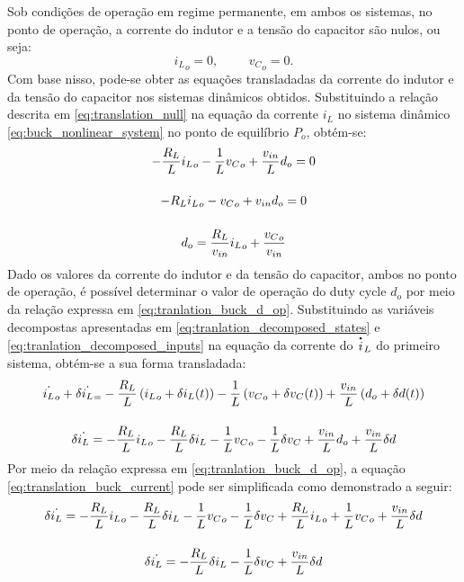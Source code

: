 Sob condições de operação em regime permanente, em ambos os sistemas, no ponto de operação, a corrente do indutor e a tensão do capacitor são nulos, ou seja: \begin{equation} {i_L}_o = 0, \hspace{1cm} {v_C}_o = 0. \label{eq:translation_null}\end{equation} Com base nisso, pode-se obter as equações transladadas da corrente do indutor e da tensão do capacitor nos sistemas dinâmicos obtidos. Substituindo a relação descrita em \eqref{eq:translation_null} na equação da corrente $i_L$ no sistema dinâmico \eqref{eq:buck_nonlinear_system} no ponto de equilíbrio $P_o$, obtém-se: \begin{gather}
  - \frac{R_L}{L} {i_L}_o - \frac{1}{L} {v_C}_o + \frac{v_{in}}{L}  d_o = 0  \notag \\[12pt]
  - R_L {i_L}_o - {v_C}_o + v_{in}  d_o = 0 \notag \\[12pt]
  d_o = \frac{R_L}{v_{in}} {i_L}_o + \frac{{v_C}_o}{v_{in}} \label{eq:tranlation_buck_d_op}
\end{gather} Dado os valores da corrente do indutor e da tensão do capacitor, ambos no ponto de operação, é possível determinar o valor de operação do duty cycle $d_o$ por meio da relação expressa em \eqref{eq:tranlation_buck_d_op}. Substituindo as variáveis decompostas apresentadas em \eqref{eq:tranlation_decomposed_states} e \eqref{eq:tranlation_decomposed_inputs} na equação da corrente do $\dt{i}_L$ do primeiro sistema, obtém-se a sua forma transladada: \begin{gather}
  {\dot{i_L}}_o + \delta \dot{i_L}_ = - \frac{R_L}{L} \left({i_L}_o + \delta i_L(t)\right) - \frac{1}{L} \left({v_C}_o + \delta v_C(t)\right) + \frac{v_{in}}{L} \left(d_o + \delta d(t)\right) \notag\\[12pt]
  \delta \dot{i_L} = - \frac{R_L}{L} {i_L}_o - \frac{R_L}{L} \delta i_L - \frac{1}{L} {v_C}_o - \frac{1}{L} \delta v_C + \frac{v_{in}}{L} d_o + \frac{v_{in}}{L} \delta d \label{eq:translation_buck_current}
\end{gather} Por meio da relação expressa em \eqref{eq:tranlation_buck_d_op}, a equação \eqref{eq:translation_buck_current} pode ser simplificada como demonstrado a seguir: \begin{gather}
  \delta \dot{i_L} = - \frac{R_L}{L} {i_L}_o - \frac{R_L}{L} \delta i_L - \frac{1}{L} {v_C}_o - \frac{1}{L} \delta v_C +  \frac{R_L}{L} {i_L}_o + \frac{1}{L} {v_C}_o + \frac{v_{in}}{L} \delta d \notag \\[12pt]
  \delta \dot{i_L} = - \frac{R_L}{L} \delta i_L - \frac{1}{L} \delta v_C  + \frac{v_{in}}{L} \delta d \label{eq:translation_buck_current_simplified}
\end{gather}

